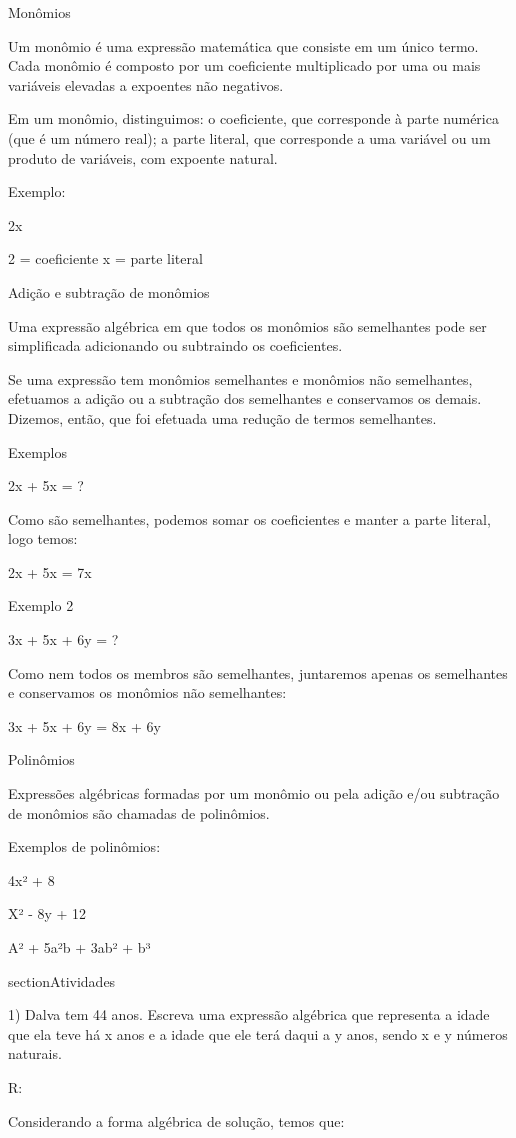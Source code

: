 Monômios

Um monômio é uma expressão matemática que consiste em um único termo.
Cada monômio é composto por um coeficiente multiplicado por uma ou mais
variáveis elevadas a expoentes não negativos.

Em um monômio, distinguimos: o coeficiente, que corresponde à parte
numérica (que é um número real); a parte literal, que corresponde a uma
variável ou um produto de variáveis, com expoente natural.

Exemplo:

2x

2 = coeficiente x = parte literal

Adição e subtração de monômios

Uma expressão algébrica em que todos os monômios são semelhantes pode
ser simplificada adicionando ou subtraindo os coeficientes.

Se uma expressão tem monômios semelhantes e monômios não semelhantes,
efetuamos a adição ou a subtração dos semelhantes e conservamos os
demais. Dizemos, então, que foi efetuada uma redução de termos
semelhantes.

Exemplos

2x + 5x = ?

Como são semelhantes, podemos somar os coeficientes e manter a parte
literal, logo temos:

2x + 5x = 7x

Exemplo 2

3x + 5x + 6y = ?

Como nem todos os membros são semelhantes, juntaremos apenas os
semelhantes e conservamos os monômios não semelhantes:

3x + 5x + 6y = 8x + 6y

Polinômios

Expressões algébricas formadas por um monômio ou pela adição e/ou
subtração de monômios são chamadas de polinômios.

Exemplos de polinômios:

4x² + 8

X² - 8y + 12

A² + 5a²b + 3ab² + b³

section{Atividades}

1) Dalva tem 44 anos. Escreva uma expressão algébrica que representa a
idade que ela teve há x anos e a idade que ele terá daqui a y anos,
sendo x e y números naturais.

R:

Considerando a forma algébrica de solução, temos que:

